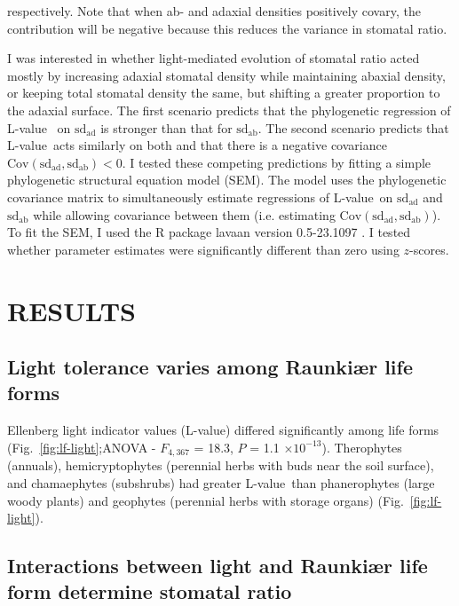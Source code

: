 \documentclass[12pt, oneside]{article}
\newcommand{\pkg}[1]{{\fontseries{b}\selectfont #1}}
\newcommand{\el}{L-value}
\begin{document}
respectively. Note that when ab- and adaxial densities positively covary, the contribution will be negative because this reduces the variance in stomatal ratio.

I was interested in whether light-mediated evolution of stomatal ratio acted mostly by increasing adaxial stomatal density while maintaining abaxial density, or keeping total stomatal density the same, but shifting a greater proportion to the adaxial surface. The first scenario predicts that the phylogenetic regression of \el~ on $\mathrm{sd_{ad}}$ is stronger than that for $\mathrm{sd_{ab}}$. The second scenario predicts that \el~acts similarly on both and that there is a negative covariance $\mathrm{Cov(sd_{ad}, sd_{ab}) < 0}$. I tested these competing predictions by fitting a simple phylogenetic structural equation model (SEM). The model uses the phylogenetic covariance matrix to simultaneously estimate regressions of \el~on $\mathrm{sd_{ad}}$ and $\mathrm{sd_{ab}}$ while allowing covariance between them (i.e. estimating $\mathrm{Cov(sd_{ad}, sd_{ab})}$). To fit the SEM, I used the R package \pkg{lavaan} version 0.5-23.1097 \citep{Rosseel_2012}. I tested whether parameter estimates were significantly different than zero using $z$-scores.


\section*{RESULTS}

\subsection*{Light tolerance varies among Raunki\ae r life forms}

Ellenberg light indicator values (\el) differed significantly among life forms (Fig.~\ref{fig:lf-light};ANOVA - $F_{4, 367}$ = 18.3, $P$ = 1.1 $\times10^{-13}$). Therophytes (annuals), hemicryptophytes (perennial herbs with buds near the soil surface), and chamaephytes (subshrubs) had greater \el~than phanerophytes (large woody plants) and geophytes (perennial herbs with storage organs) (Fig.~\ref{fig:lf-light}).

\subsection*{Interactions between light and Raunki\ae r life form determine stomatal ratio}
\end{document}
